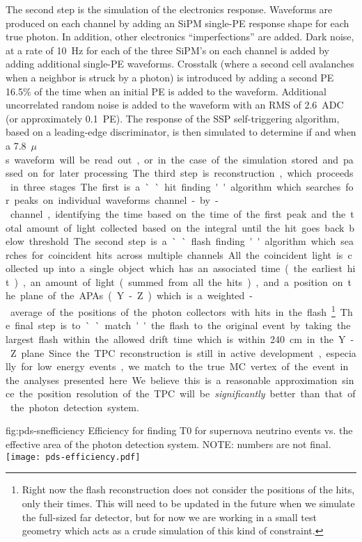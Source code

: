 The second step is the simulation of the electronics response. Waveforms are produced on each channel by adding an SiPM single-PE response shape for each true photon. In addition, other electronics ``imperfections'' are added. Dark noise, at a rate of \SI{10}{Hz} for each of the three SiPM's on each channel is added by adding additional single-PE waveforms. Crosstalk (where a second cell avalanches when a neighbor is struck by a photon) is introduced by adding a second PE \num{16.5}\% of the time when an initial PE is added to the waveform. Additional uncorrelated random noise is added to the waveform with an RMS of \SI{2.6}{ADC} (or approximately \SI{0.1}{PE}). The response of the SSP self-triggering algorithm, based on a leading-edge discriminator, is then simulated to determine if and when a \SI{7.8}{$\mu$s} waveform will be read out, or in the case of the simulation stored and passed on for later processing.

The third step is reconstruction, which proceeds in three stages. The first is a ``hit finding'' algorithm which searches for peaks on individual waveforms channel-by-channel, identifying the time based on the time of the first peak and the total amount of light collected based on the integral until the hit goes back below threshold. The second step is a ``flash finding'' algorithm which searches for coincident hits across multiple channels. All the coincident light is collected up into a single object which has an associated time (the earliest hit), an amount of light (summed from all the hits), and a position on the plane of the APAs (Y-Z) which is a weighted-average of the positions of the photon collectors with hits in the flash\footnote{Right now the flash reconstruction does not consider the positions of the hits, only their times. This will need to be updated in the future when we simulate the full-sized far detector, but for now we are working in a small test geometry which acts as a crude simulation of this kind of constraint.}. The final step is to ``match'' the flash to the original event by taking the largest flash within the allowed drift time which is within \SI{240}{cm} in the Y-Z plane. Since the TPC reconstruction is still in active development, especially for low energy events, we match to the true MC vertex of the event in the analyses presented here. We believe this is a reasonable approximation since the position resolution of the TPC will be \emph{significantly} better than that of the photon detection system. 

\begin{dunefigure}{fig:pds-snefficiency}
{Efficiency for finding T0 for supernova neutrino events vs. the effective area of the photon detection system. NOTE: numbers are not final.}
  \texttt{[image: pds-efficiency.pdf]}
\end{dunefigure}

